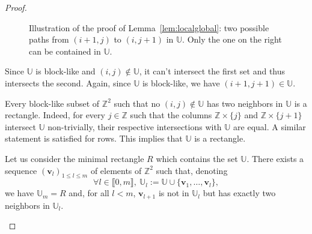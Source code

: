 \documentclass{article}
\begin{document}
\begin{proof}
\begin{figure}
\begin{center}
\end{center}
\caption{Illustration of the proof of Lemma~\ref{lem:localglobal}: two possible paths from $(i+1,j)$ to $(i,j+1)$ in $\mathbb{U}$. Only the one on the right can be contained in $\mathbb{U}$.\label{figure.intersection}}
\end{figure}


Since $\mathbb{U}$ is block-like and $(i,j) 
\notin \mathbb{U}$, it can't intersect the first set and thus intersects the second. Again, since $\mathbb{U}$ is block-like, we have $(i+1,j+1) \in \mathbb{U}$.

Every block-like subset of $\mathbb{Z}^2$ such that no $(i,j) \notin \mathbb{U}$ has two neighbors in $\mathbb{U}$ is a rectangle. Indeed, for every $j \in \mathbb{Z}$ such that the columns $\mathbb{Z} \times \{j\}$ and $\mathbb{Z} \times \{j+1\}$ intersect $\mathbb{U}$ non-trivially, 
their respective intersections with $\mathbb{U}$ are equal. A similar statement is 
satisfied for rows. This implies that $\mathbb{U}$ is a rectangle. 

Let us consider the minimal rectangle $R$ which contains the set $\mathbb{U}$. There 
exists a sequence $(\textbf{v}_l)_{1 \le l \le m}$ of elements of $\mathbb{Z}^2$ such that, denoting
\[\forall l \in \llbracket 0,m\rrbracket,\  \mathbb{U}_l := \mathbb{U} \cup \{\textbf{v}_1 , \dots , \textbf{v}_l\},\] we have $\mathbb{U}_m = R$ and, for all $l <m$, $\textbf{v}_{l+1}$ is not in $\mathbb{U}_l$ but has exactly two neighbors in $\mathbb{U}_l$. 

\begin{figure}
\begin{center}
\end{center}
\end{figure}
\end{proof}
\end{document}
